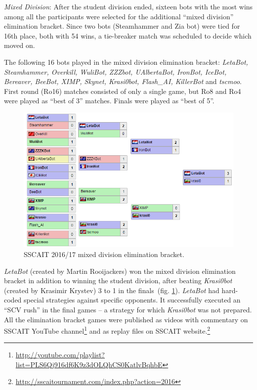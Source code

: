 \emph{Mixed Division}: After the student division ended, sixteen bots with the most wins among all the participants were selected for the additional “mixed division” elimination bracket. Since two bots (Steamhammer and Zia bot) were tied for 16th place, both with 54 wins, a tie-breaker match was scheduled to decide which moved on. 

The following 16 bots played in the mixed division elimination bracket: {\em LetaBot, Steamhammer, Overkill, WuliBot, ZZZbot, UAlbertaBot, IronBot, IceBot, Bereaver, BeeBot, XIMP, Skynet, Krasi0bot, Flash\_AI, KillerBot} and {\em tscmoo}. First round (Ro16) matches consisted of only a single game, but Ro8 and Ro4 were played as ``best of 3'' matches. Finals were played as ``best of 5''.\\

\begin{figure}[t] 
  \centering
  \includegraphics[width=1.04\columnwidth]{fig/sscait-bracket.png}
  \caption{SSCAIT 2016/17 mixed division elimination bracket.}
  \label{figSSCAITbracket}
\end{figure}
 
{\em LetaBot} (created by Martin Rooijackers) won the mixed division elimination bracket in addition to winning the student division, after beating {\em Krasi0bot} (created by Krasimir Krystev) 3 to 1 in the finals~(fig. \ref{figSSCAITbracket}). {\em LetaBot} had hard-coded special strategies against specific opponents. It successfully executed an ``SCV rush'' in the final games -- a strategy for which {\em Krasi0bot} was not prepared. All the elimination bracket games were published as videos with commentary on SSCAIT YouTube channel\footnote{\url{http://youtube.com/playlist?list=PLS6Qj916df6K9z3dOLQhCS0KatlvBqhbE}} and as replay files on SSCAIT website.\footnote{\url{http://sscaitournament.com/index.php?action=2016}} 




